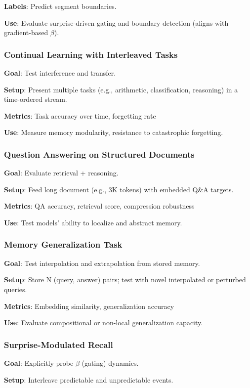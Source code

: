 \documentclass[11pt]{article}
\begin{document}
\textbf{Labels}: Predict segment boundaries.

\textbf{Use}: Evaluate surprise-driven gating and boundary detection (aligns with gradient-based $\beta$).

\subsubsection{Continual Learning with Interleaved Tasks}
\textbf{Goal}: Test interference and transfer.

\textbf{Setup}: Present multiple tasks (e.g., arithmetic, classification, reasoning) in a time-ordered stream.

\textbf{Metrics}: Task accuracy over time, forgetting rate

\textbf{Use}: Measure memory modularity, resistance to catastrophic forgetting.

\subsubsection{Question Answering on Structured Documents}
\textbf{Goal}: Evaluate retrieval + reasoning.

\textbf{Setup}: Feed long document (e.g., 3K tokens) with embedded Q\&A targets.

\textbf{Metrics}: QA accuracy, retrieval score, compression robustness

\textbf{Use}: Test models' ability to localize and abstract memory.

\subsubsection{Memory Generalization Task}
\textbf{Goal}: Test interpolation and extrapolation from stored memory.

\textbf{Setup}: Store N (query, answer) pairs; test with novel interpolated or perturbed queries.

\textbf{Metrics}: Embedding similarity, generalization accuracy

\textbf{Use}: Evaluate compositional or non-local generalization capacity.

\subsubsection{Surprise-Modulated Recall}
\textbf{Goal}: Explicitly probe $\beta$ (gating) dynamics.

\textbf{Setup}: Interleave predictable and unpredictable events.
\end{document}

